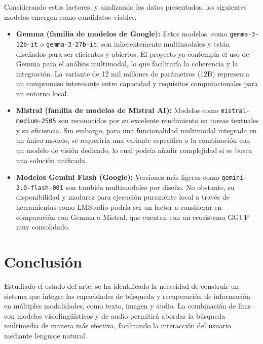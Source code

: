 Considerando estos factores, y analizando los datos presentados, los siguientes modelos emergen como candidatos viables:

\begin{itemize}
    \item \textbf{Gemma (familia de modelos de Google):} Estos modelos, como \texttt{gemma-3-12b-it} o \texttt{gemma-3-27b-it}, son inherentemente multimodales y están diseñados para ser eficientes y abiertos. El proyecto ya contempla el uso de Gemma para el análisis multimodal, lo que facilitaría la coherencia y la integración. La variante de 12 mil millones de parámetros (12B) representa un compromiso interesante entre capacidad y requisitos computacionales para un entorno local.
    \item \textbf{Mistral (familia de modelos de Mistral AI):} Modelos como \texttt{mistral-medium-2505} son reconocidos por su excelente rendimiento en tareas textuales y su eficiencia. Sin embargo, para una funcionalidad multimodal integrada en un único modelo, se requeriría una variante específica o la combinación con un modelo de visión dedicado, lo cual podría añadir complejidad si se busca una solución unificada.
    \item \textbf{Modelos Gemini Flash (Google):} Versiones más ligeras como \texttt{gemini-2.0-flash-001} son también multimodales por diseño. No obstante, su disponibilidad y madurez para ejecución puramente local a través de herramientas como LMStudio podría ser un factor a considerar en comparación con Gemma o Mistral, que cuentan con un ecosistema GGUF muy consolidado.
\end{itemize}

\section{Conclusión}
\label{sec:conclusion}

Estudiado el estado del arte, se ha identificado la necesidad de construir un sistema que integre las capacidades de búsqueda y recuperación de información en múltiples modalidades, como texto, imagen y audio. La combinación de \glspl{llm} con modelos visiolingüísticos y de audio permitirá abordar la búsqueda multimedia de manera más efectiva, facilitando la interacción del usuario mediante lenguaje natural.